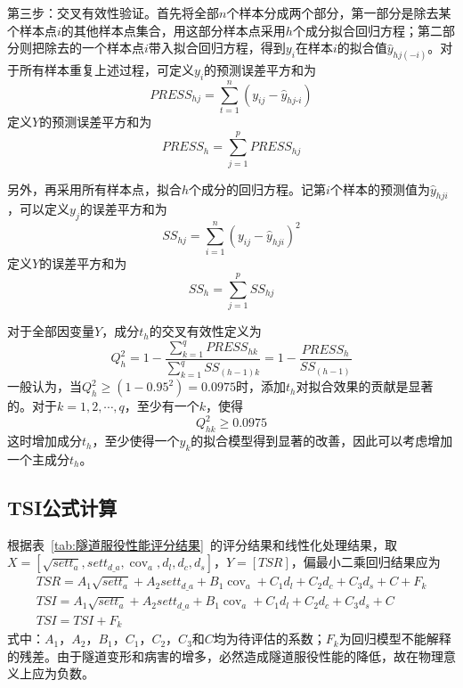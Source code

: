 第三步：交叉有效性验证。首先将全部$n$个样本分成两个部分，第一部分是除去某个样本点$i$的其他样本点集合，用这部分样本点采用$h$个成分拟合回归方程；第二部分则把除去的一个样本点$i$带入拟合回归方程，得到$y_i$在样本$i$的拟合值${{\hat{y}}_{hj(-i)}}$。对于所有样本重复上述过程，可定义$y_i$的预测误差平方和为
\begin{equation}
    \label{equ:press}
    PRES{{S}_{hj}}=\sum\limits_{t=1}^{n}{\left( {{y}_{ij}}-{{{\hat{y}}}_{hj\text{-}i}} \right)}
\end{equation}
定义$Y$的预测误差平方和为
\begin{equation}
    {{PRESS}_{h}}=\sum\limits_{j=1}^{p}{{{PRESS}_{hj}}}
\end{equation}

另外，再采用所有样本点，拟合$h$个成分的回归方程。记第$i$个样本的预测值为${{\hat{y}}_{hji}}$，可以定义$y_j$的误差平方和为
\begin{equation}
    S{{S}_{hj}}=\sum\limits_{i=1}^{n}{{{\left( {{y}_{ij}}-\hat{y}_{hji} \right)}^{2}}}
\end{equation}
定义$Y$的误差平方和为
\begin{equation}
    S{{S}_{h}}=\sum\limits_{j=1}^{p}{S{{S}_{hj}}}
\end{equation}

对于全部因变量$Y$，成分$t_h$的交叉有效性定义为
\begin{equation}
    Q_{h}^{2}=1-\frac{\sum\limits_{k=1}^{q}{PRES{{S}_{hk}}}}{\sum\limits_{k=1}^{q}{S{{S}_{(h-1)k}}}}=1-\frac{PRES{{S}_{h}}}{S{{S}_{(h-1)}}}
\end{equation}
一般认为，当$Q_{h}^{2}\ge (1-{{0.95}^{2}})=0.0975$时，添加$t_h$对拟合效果的贡献是显著的。对于$k=1,2,\cdots ,q$，至少有一个$k$，使得
\begin{equation}
    Q_{hk}^{2}\ge 0.0975
\end{equation}
这时增加成分$t_h$，至少使得一个$y_k$的拟合模型得到显著的改善，因此可以考虑增加一个主成分$t_h$。

\subsection{TSI公式计算}

根据表~\ref{tab:隧道服役性能评分结果}~的评分结果和线性化处理结果，取$X=\left[ \sqrt{set{{t}_{a}}},set{{t}_{d\_a}},{{\operatorname{cov}}_{a}},{{d}_{l}},{{d}_{c}},{{d}_{s}} \right]$，$Y=\left[ TSR \right]$，偏最小二乘回归结果应为
\begin{gather}
    TSR={{A}_{1}}\sqrt{set{{t}_{a}}}+{{A}_{2}}set{{t}_{d\_a}}+{{B}_{1}}{{\operatorname{cov}}_{a}}+{{C}_{1}}{{d}_{l}}+{{C}_{2}}{{d}_{c}}+{{C}_{3}}{{d}_{s}}+C+{{F}_{k}} \\ 
    TSI={{A}_{1}}\sqrt{set{{t}_{a}}}+{{A}_{2}}set{{t}_{d\_a}}+{{B}_{1}}{{\operatorname{cov}}_{a}}+{{C}_{1}}{{d}_{l}}+{{C}_{2}}{{d}_{c}}+{{C}_{3}}{{d}_{s}}+C \\ 
    TSI=TSI+{{F}_{k}}
\end{gather}
式中：$A_1$，$A_2$，$B_1$，$C_1$，$C_2$，$C_3$和$C$均为待评估的系数；$F_k$为回归模型不能解释的残差。由于隧道变形和病害的增多，必然造成隧道服役性能的降低，故在物理意义上应为负数。


